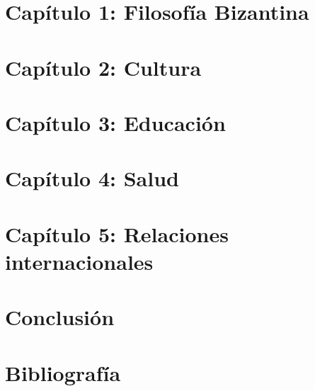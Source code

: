 \documentclass[a4paper,13pt,titlepage,oneside]{article}
\begin{document}
\section{Capítulo 1: Filosofía Bizantina}

\newpage

\section{Capítulo 2: Cultura}

\newpage

\section{Capítulo 3: Educación}

\newpage

\section{Capítulo 4: Salud}

\newpage

\section{Capítulo 5: Relaciones internacionales}

\newpage

\section{Conclusión}

\newpage

\section{Bibliografía}

\newpage

\tableofcontents
\end{document}
